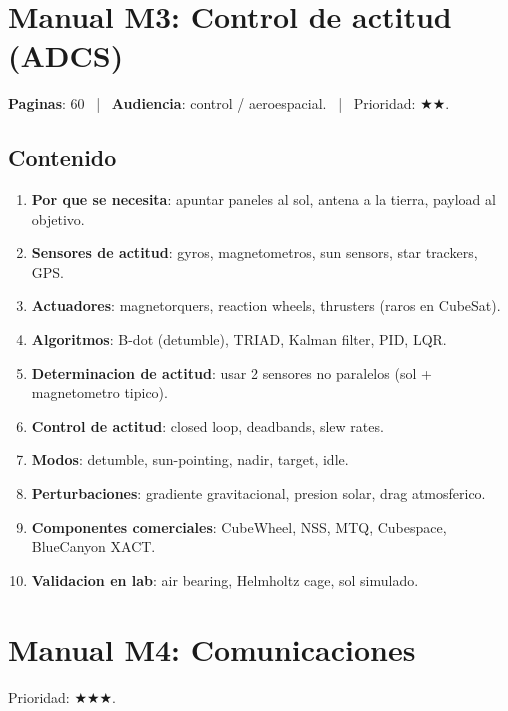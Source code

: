 \documentclass[11pt,a4paper,oneside]{report}
\begin{document}
\chapter{Manual M3: Control de actitud (ADCS)}

\textbf{Paginas}: 60 ~|~ \textbf{Audiencia}: control / aeroespacial.
~|~ Prioridad: $\bigstar\bigstar$.

\section{Contenido}

\begin{enumerate}[leftmargin=2em]
  \item \textbf{Por que se necesita}: apuntar paneles al sol, antena a la
        tierra, payload al objetivo.
  \item \textbf{Sensores de actitud}: gyros, magnetometros, sun sensors,
        star trackers, GPS.
  \item \textbf{Actuadores}: magnetorquers, reaction wheels, thrusters
        (raros en CubeSat).
  \item \textbf{Algoritmos}: B-dot (detumble), TRIAD, Kalman filter, PID,
        LQR.
  \item \textbf{Determinacion de actitud}: usar 2 sensores no paralelos
        (sol + magnetometro tipico).
  \item \textbf{Control de actitud}: closed loop, deadbands, slew rates.
  \item \textbf{Modos}: detumble, sun-pointing, nadir, target, idle.
  \item \textbf{Perturbaciones}: gradiente gravitacional, presion solar,
        drag atmosferico.
  \item \textbf{Componentes comerciales}: CubeWheel, NSS, MTQ, Cubespace,
        BlueCanyon XACT.
  \item \textbf{Validacion en lab}: air bearing, Helmholtz cage, sol
        simulado.
\end{enumerate}

\chapter{Manual M4: Comunicaciones}

\begin{prioritario}
Prioridad: $\bigstar\bigstar\bigstar$.
\end{prioritario}
\end{document}

